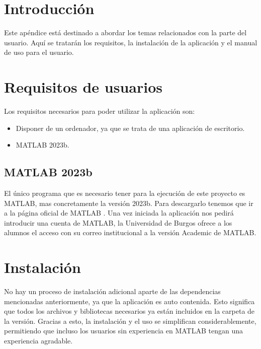 
\section{Introducción}\label{introducción-manual-usuario}

Este apéndice está destinado a abordar los temas relacionados con la parte del usuario. Aquí se tratarán los requisitos, la instalación de la aplicación y el manual de uso para el usuario.

\section{Requisitos de usuarios}\label{requisitos-de-usuario}

Los requisitos necesarios para poder utilizar la aplicación son:

\begin{itemize}
    \item Disponer de un ordenador, ya que se trata de una aplicación de escritorio.
    \item MATLAB 2023b.
\end{itemize}

\subsection{MATLAB 2023b}\label{matlab-2023b-usuario}

El único programa que es necesario tener para la ejecución de este proyecto es MATLAB, mas concretamente la versión 2023b. Para descargarlo tenemos que ir a la página oficial de MATLAB \cite{matlab2023b}. Una vez iniciada la aplicación nos pedirá introducir una cuenta de MATLAB, la Universidad de Burgos ofrece a los alumnos el acceso con su correo institucional a la versión Academic de MATLAB.

\section{Instalación}\label{instalación-usuario}

No hay un proceso de instalación adicional aparte de las dependencias mencionadas anteriormente, ya que la aplicación es auto contenida. Esto significa que todos los archivos y bibliotecas necesarios ya están incluidos en la carpeta de la versión. Gracias a esto, la instalación y el uso se simplifican considerablemente, permitiendo que incluso los usuarios sin experiencia en MATLAB tengan una experiencia agradable.

